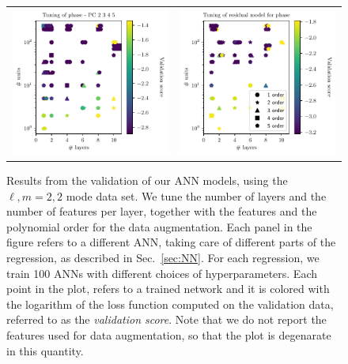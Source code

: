 \documentclass[twocolumn,showpacs,preprintnumbers,nofootinbib,prd,
superscriptaddress,10pt]{revtex4-2}
\begin{document}
\begin{figure}[t]
\begin{tabular}{cc}
		\includegraphics[scale = 0.9]{tuning_ph_2345} &
		\includegraphics[scale = 0.9]{tuning_ph_01_residual}
	\end{tabular}
	\caption{Results from the validation of our ANN models, using the $\ell, m = 2,2$ mode data set. We tune the number of layers and the number of features per layer, together with the features and the polynomial order for the data augmentation.
	Each panel in the figure refers to a different ANN, taking care of different parts of the regression, as described in Sec.~\ref{sec:NN}.
	For each regression, we train 100 ANNs with different choices of hyperparameters. Each point in the plot, refers to a trained network and it is colored with the logarithm of the loss function computed on the validation data, referred to as the {\it validation score}. Note that we do not report the features used for data augmentation, so that the plot is degenarate in this quantity.
	}
	\label{fig:tuning}
\end{figure}
\end{document}
